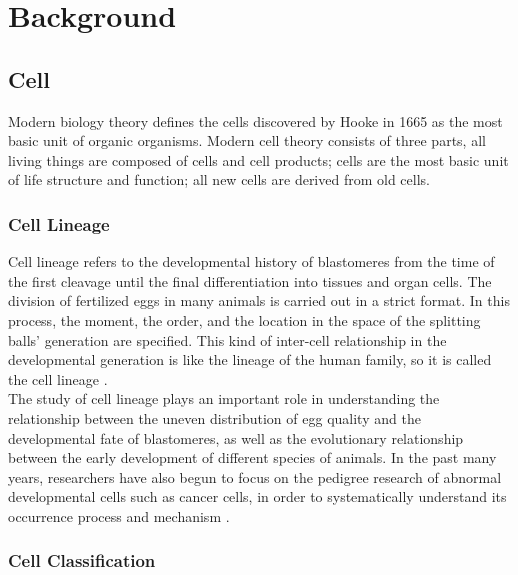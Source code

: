 \chapter{Background} %

\label{Background} %

\section{Cell}

Modern biology theory defines the cells discovered by Hooke in 1665 as the most basic unit of organic organisms. Modern cell theory consists of three parts, all living things are composed of cells and cell products; cells are the most basic unit of life structure and function; all new cells are derived from old cells.

\subsection{Cell Lineage}

Cell lineage refers to the developmental history of blastomeres from the time of the first cleavage until the final differentiation into tissues and organ cells. The division of fertilized eggs in many animals is carried out in a strict format. In this process, the moment, the order, and the location in the space of the splitting balls' generation are specified. This kind of inter-cell relationship in the developmental generation is like the lineage of the human family, so it is called the cell lineage \parencite{regev_human_2017,nowogrodzki_how_2017}. \\

The study of cell lineage plays an important role in understanding the relationship between the uneven distribution of egg quality and the developmental fate of blastomeres, as well as the evolutionary relationship between the early development of different species of animals. In the past many years, researchers have also begun to focus on the pedigree research of abnormal developmental cells such as cancer cells, in order to systematically understand its occurrence process and mechanism \parencite{regev_human_2017}.

\subsection{Cell Classification}

